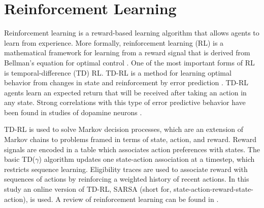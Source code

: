 \section{Reinforcement Learning}
\label{sec:RL}
Reinforcement learning is a reward-based learning algorithm that allows agents
to learn from experience. More formally, reinforcement
learning (RL) is a mathematical framework for learning from a reward signal that
is derived from Bellman's equation for optimal control \cite{sutton1998introduction}. One of
the most important forms of RL is temporal-difference (TD) RL. TD-RL is a method
for learning optimal behavior from changes in state and reinforcement by error
prediction \cite{sutton1988learning}. TD-RL agents learn an expected return that will be
received after taking an action in any state. Strong correlations with this type of
error predictive behavior have been found in studies of dopamine neurons
\cite{schultz1993responses}. 

TD-RL is used to solve Markov decision processes, which are an extension of
Markov chains to problems framed in terms of state, action, and reward. Reward signals are encoded
in a table which associates action preferences with states. The basic
TD($\gamma$) algorithm updates one state-action association at a timestep, which
restricts sequence learning. Eligibility traces are used to associate reward
with sequences of actions by reinforcing a weighted history of recent
actions. In this study an online version of TD-RL, SARSA (short for,
state-action-reward-state-action), is used. A review of 
reinforcement learning can be found in \cite{sutton1998introduction}.


